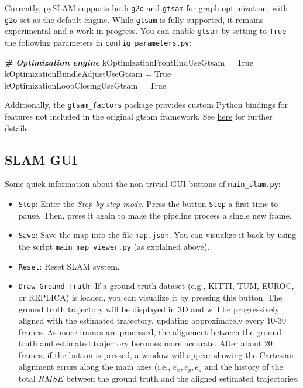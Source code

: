 \documentclass{article}
\newenvironment{Shaded}{\begin{snugshade}}{\end{snugshade}}
\newcommand{\CommentTok}[1]{\textcolor[rgb]{0.00,0.40,1.00}{\textbf{\textit{#1}}}}
\newcommand{\NormalTok}[1]{\textcolor[rgb]{0.74,0.68,0.62}{#1}}
\newcommand{\OperatorTok}[1]{\textcolor[rgb]{0.74,0.68,0.62}{#1}}
\newcommand{\VariableTok}[1]{\textcolor[rgb]{0.74,0.68,0.62}{#1}}
\begin{document}
Currently, pySLAM supports both \texttt{g2o} and \texttt{gtsam} for
graph optimization, with \texttt{g2o} set as the default engine. While
\texttt{gtsam} is fully supported, it remains experimental and a work in
progress. You can enable \texttt{gtsam} by setting to \texttt{True} the
following parameters in \texttt{config\_parameters.py}:

\begin{scriptsize}
  \begin{Shaded}
    \begin{Highlighting}[]
      \CommentTok{# Optimization engine }
    \NormalTok{  kOptimizationFrontEndUseGtsam }\OperatorTok{=} \VariableTok{True}    
    \NormalTok{  kOptimizationBundleAdjustUseGtsam }\OperatorTok{=} \VariableTok{True} 
    \NormalTok{  kOptimizationLoopClosingUseGtsam }\OperatorTok{=} \VariableTok{True} 
    \end{Highlighting}
    \end{Shaded}
\end{scriptsize}

Additionally, the \texttt{gtsam\_factors} package provides custom Python
bindings for features not included in the original gtsam framework. See
\href{./thirdparty/gtsam_factors/README.md}{here} for further details.

\hypertarget{slam-gui}{%
\subsection{SLAM GUI}\label{slam-gui}}

Some quick information about the non-trivial GUI buttons of \texttt{main\_slam.py}:

\begin{itemize}
    \item \texttt{Step}: Enter the \emph{Step by step mode}. Press the button \texttt{Step} a first time to pause. Then, press it again to make the pipeline process a single new frame.

    \item \texttt{Save}: Save the map into the file \texttt{map.json}. You can visualize it back by using the script \texttt{main\_map\_viewer.py} (as explained above).

    \item \texttt{Reset}: Reset SLAM system.

    \item \texttt{Draw Ground Truth}: If a ground truth dataset (e.g., KITTI,
    TUM, EUROC, or REPLICA) is loaded, you can visualize it by pressing this
    button. The ground truth trajectory will be displayed in 3D and will be
    progressively aligned with the estimated trajectory, updating
    approximately every 10-30 frames. As more frames are processed, the
    alignment between the ground truth and estimated trajectory becomes more
    accurate. After about 20 frames, if the button is pressed, a window will
    appear showing the Cartesian alignment errors along the main axes (i.e.,
    $e_x, e_y, e_z$ and the history of the total $RMSE$ between
    the ground truth and the aligned estimated trajectories.
\end{itemize}
\end{document}
